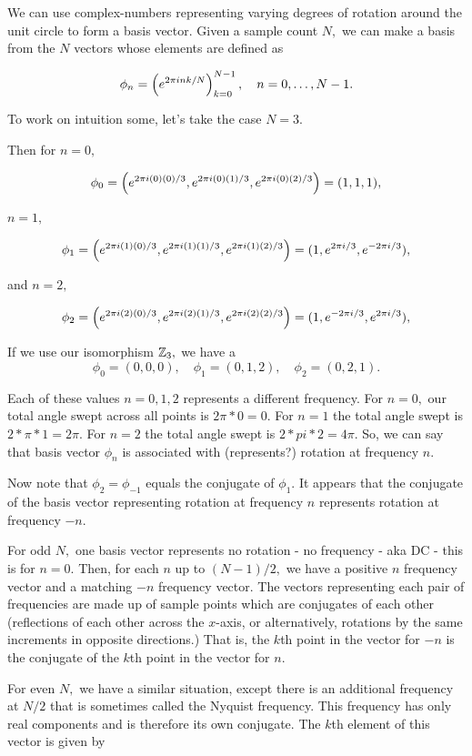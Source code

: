\documentclass{article}
\begin{document}
We can use \@{complex-numbers} representing varying degrees of rotation around the unit circle to form a basis vector. Given a sample count $N,$ we can make a basis from the $N$ vectors whose elements are defined as

\[ \phi_n = \left(e^{2 \pi i n k / N}\right)_{k=0}^{N-1}, \quad n = 0, \dots, N-1. \]

To work on intuition some, let's take the case $N = 3.$

Then for $n = 0,$

\[ \phi_0 = \left(e^{2 \pi i (0)(0)/ 3}, e^{2 \pi i (0)(1)/ 3}, e^{2 \pi i (0)(2)/ 3}\right) = (1, 1, 1), \]

$n = 1,$ 

\[ \phi_1 = \left(e^{2 \pi i (1)(0)/ 3}, e^{2 \pi i (1)(1)/ 3}, e^{2 \pi i (1)(2)/ 3}\right) = (1, e^{2 \pi i / 3}, e^{-2 \pi i / 3} ), \]

and $n = 2,$

\[ \phi_2 = \left(e^{2 \pi i (2)(0)/ 3}, e^{2 \pi i (2)(1)/ 3}, e^{2 \pi i (2)(2)/ 3}\right) = (1, e^{-2 \pi i / 3}, e^{2 \pi i / 3} ), \]

If we use our isomorphism $\mathbb{Z}_3,$ we have
a
\[ \phi_0 = (0, 0, 0), \quad \phi_1 = (0, 1, 2), \quad \phi_2 = (0, 2, 1). \]

Each of these values $n = 0, 1, 2$ represents a different frequency. For $n = 0,$ our total angle swept across all points is $2 \pi * 0 = 0.$ For $n = 1$ the total angle swept is $2 * \pi * 1 = 2 \pi.$ For $n = 2$ the total angle swept is $2 * pi * 2 = 4 \pi.$ So, we can say that basis vector $\phi_n$ is associated with (represents?) rotation at frequency $n.$

Now note that $\phi_2 = \phi_{-1}$ equals the conjugate of $\phi_1.$ It appears that the conjugate of the basis vector representing rotation at frequency $n$ represents rotation at frequency $-n.$

For odd $N,$ one basis vector represents no rotation - no frequency - aka DC - this is for $n=0.$ Then, for each $n$ up to $(N-1)/2,$ we have a positive $n$ frequency vector and a matching $-n$ frequency vector. The vectors representing each pair of frequencies are made up of sample points which are conjugates of each other (reflections of each other across the $x$-axis, or alternatively, rotations by the same increments in opposite directions.) That is, the $k$th point in the vector for $-n$ is the conjugate of the $k$th point in the vector for $n.$

For even $N,$ we have a similar situation, except there is an additional frequency at $N/2$ that is sometimes called the Nyquist frequency. This frequency has only real components and is therefore its own conjugate. The $k$th element of this vector is given by
\end{document}
